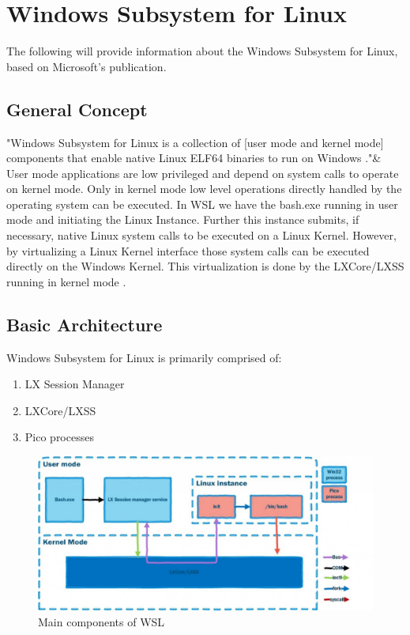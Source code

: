 \documentclass[utf8,biblatex, ngerman, english]{lni}
\begin{document}
\section{Windows Subsystem for Linux}
The following will provide information about the Windows Subsystem for Linux, based on Microsoft's publication.

\subsection{General Concept}
"Windows Subsystem for Linux is a collection of [user mode and kernel mode] components that enable native Linux ELF64 binaries to run on Windows \cite{WSL16}."& User mode applications are low privileged and depend on system calls to operate on kernel mode. Only in kernel mode low level operations directly handled by the operating system can be executed. In WSL we have the bash.exe running in user mode and initiating the Linux Instance. Further this instance submits, if necessary, native Linux system calls to be executed on a Linux Kernel. However, by virtualizing a Linux Kernel interface those system calls can be executed directly on the Windows Kernel. This virtualization is done by the LXCore/LXSS running in kernel mode \cite{WSL16}.

\subsection{Basic Architecture}



Windows Subsystem for Linux is primarily comprised of: 
\begin{enumerate}
    \item LX Session Manager
    \item LXCore/LXSS
    \item Pico processes
\end{enumerate}

\begin{figure}
  \centering
  \includegraphics[width=1\textwidth]{WSL Architecture.pdf}
  \caption{Main components of WSL \cite{WSL16}}
  \label{img:architecture}
\end{figure}
\end{document}
